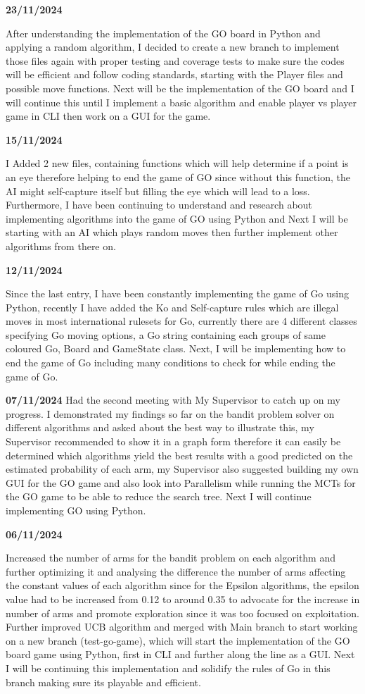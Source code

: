 \documentclass[]{final_report}
\begin{document}
\textbf{23/11/2024} 

After understanding the implementation of the GO board in Python and applying a random algorithm, I decided to create a new branch to implement those files again with proper testing and coverage tests to make sure the codes will be efficient and follow coding standards, starting with the Player files and possible move functions. Next will be the implementation of the GO board and I will continue this until I implement a basic algorithm and enable player vs player game in CLI then work on a GUI for the game. 

\textbf{15/11/2024}

I Added 2 new files, containing functions which will help determine if a point is an eye therefore helping to end the game of GO since without this function, the AI might self-capture itself but filling the eye which will lead to a loss. Furthermore, I have been continuing to understand and research about implementing algorithms into the game of GO using Python and Next I will be starting with an AI which plays random moves then further implement other algorithms from there on. 

\textbf{12/11/2024}

Since the last entry, I have been constantly implementing the game of Go using Python, recently I have added the Ko and Self-capture rules which are illegal moves in most international rulesets for Go, currently there are 4 different classes specifying Go moving options, a Go string containing each groups of same coloured Go, Board and GameState class. Next, I will be implementing how to end the game of Go including many conditions to check for while ending the game of Go.   

\textbf{07/11/2024}
Had the second meeting with My Supervisor to catch up on my progress. I demonstrated my findings so far on the bandit problem solver on different algorithms and asked about the best way to illustrate this, my Supervisor recommended to show it in a graph form therefore it can easily be determined which algorithms yield the best results with a good predicted on the estimated probability of each arm, my Supervisor also suggested building my own GUI for the GO game and also look into Parallelism while running the MCTs for the GO game to be able to reduce the search tree. Next I will continue implementing GO using Python. 

\textbf{06/11/2024}

Increased the number of arms for the bandit problem on each algorithm and further optimizing it and analysing the difference the number of arms affecting the constant values of each algorithm since for the Epsilon algorithms, the epsilon value had to be increased from 0.12 to around 0.35 to advocate for the increase in number of arms and promote exploration since it was too focused on exploitation. Further improved UCB algorithm and merged with Main branch to start working on a new branch (test-go-game), which will start the implementation of the GO board game using Python, first in CLI and further along the line as a GUI. Next I will be continuing this implementation and solidify the rules of Go in this branch making sure its playable and efficient. 
\end{document}
